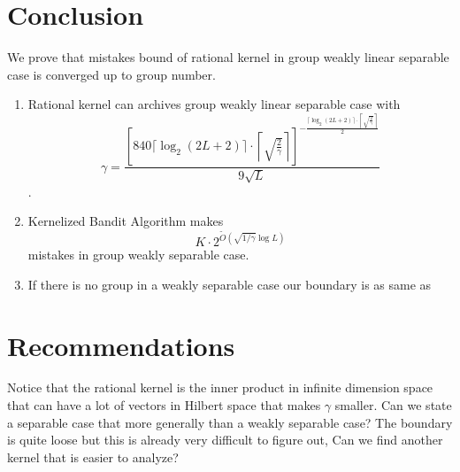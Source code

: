 \justify


\section{Conclusion}
We prove that mistakes bound of rational kernel in 
group weakly linear separable case is converged up to group number.
\begin{enumerate}
    \item Rational kernel can archives group weakly linear separable case with
$$
\gamma = \frac{\left[840\lceil\log_2(2L+2)\rceil\cdot\left\lceil\sqrt{\frac{2}{\gamma}}\right\rceil\right]^{-\frac{\lceil\log_2(2L+2)\rceil\cdot\left\lceil\sqrt{\frac{2}{\gamma}}\right\rceil}{2}}}{9\sqrt{L}}
$$.
    \item Kernelized Bandit Algorithm makes 
$$
K\cdot 2^{\tilde{O}(\sqrt{1/\gamma}\log L)}
$$
mistakes in group weakly separable case.
    \item If there is no group in a weakly separable case our boundary is as same as
\cite{BeygelzimerPSTWZ2019-separable}
\end{enumerate}

\section{Recommendations}

Notice that the rational kernel is the inner product in infinite dimension space
that can have a lot of vectors in Hilbert space that makes $\gamma$ smaller.
Can we state a separable case that more generally than a weakly separable case?
The boundary is quite loose but this is already very difficult to figure out, 
Can we find another kernel that is easier to analyze?